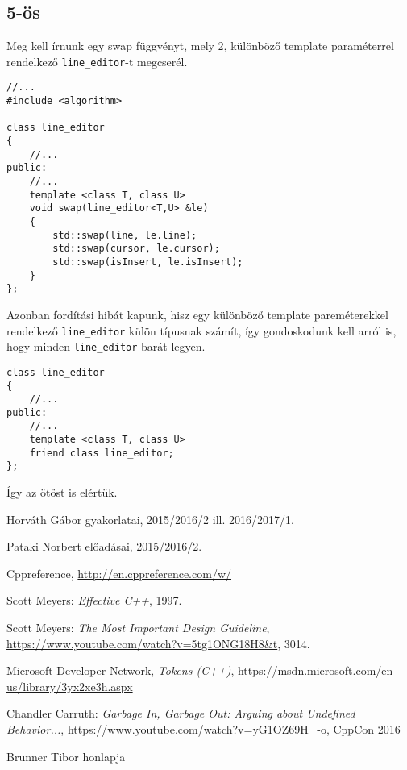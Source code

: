 \documentclass[a4paper,11.5pt,table]{article}
\begin{document}
	\subsection{5-ös}
	Meg kell írnunk egy swap függvényt, mely 2, különböző template paraméterrel rendelkező \texttt{line\_editor}-t megcserél.
	\begin{lstlisting}
//...
#include <algorithm>

class line_editor
{
	//...
public:
	//...
	template <class T, class U>
	void swap(line_editor<T,U> &le)
	{
		std::swap(line, le.line);
		std::swap(cursor, le.cursor);
		std::swap(isInsert, le.isInsert);
	}
};
	\end{lstlisting}
	Azonban fordítási hibát kapunk, hisz egy különböző template pareméterekkel rendelkező \texttt{line\_editor} külön típusnak számít, így gondoskodunk kell arról is, hogy minden \texttt{line\_editor} barát legyen.
	\begin{lstlisting}
class line_editor
{
	//...
public:
	//...
	template <class T, class U>
	friend class line_editor;
};
	\end{lstlisting}
	Így az ötöst is elértük.
	\begin{thebibliography}{1}
		
		 Horváth Gábor gyakorlatai, 2015/2016/2 ill. 2016/2017/1.
		
		 Pataki Norbert előadásai, 2015/2016/2.
		
		 Cppreference, \url{http://en.cppreference.com/w/}
		
		 Scott Meyers: \textit{Effective C++}, 1997.
		
		 Scott Meyers: \textit{The Most Important Design Guideline}, \url{https://www.youtube.com/watch?v=5tg1ONG18H8&t}, 3014.
		
		  Microsoft Developer Network, \textit{Tokens (C++)}, \url{https://msdn.microsoft.com/en-us/library/3yx2xe3h.aspx}
		
		 Chandler Carruth: \textit{Garbage In, Garbage Out: Arguing about Undefined Behavior...}, \url{https://www.youtube.com/watch?v=yG1OZ69H_-o}, CppCon 2016
		
		 Brunner Tibor honlapja
		
	\end{thebibliography}
\end{document}
